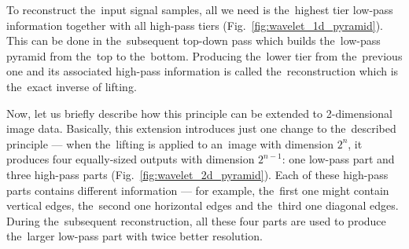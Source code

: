 To reconstruct the~input signal samples, all we need is the~highest tier low-pass information together with all high-pass tiers (Fig.~\ref{fig:wavelet_1d_pyramid}). This can be done in the~subsequent top-down pass which builds the~low-pass pyramid from the~top to the~bottom. Producing the~lower tier from the~previous one and its associated high-pass information is called the~reconstruction which is the~exact inverse of lifting.

Now, let us briefly describe how this principle can be extended to 2-dimensional image data. Basically, this extension introduces just one change to the~described principle --- when the~lifting is applied to an~image with dimension $2^n$, it produces four equally-sized outputs with dimension $2^{n-1}$: one low-pass part and three high-pass parts (Fig.~\ref{fig:wavelet_2d_pyramid}). Each of these high-pass parts contains different information --- for example, the~first one might contain vertical edges, the~second one horizontal edges and the~third one diagonal edges. During the~subsequent reconstruction, all these four parts are used to produce the~larger low-pass part with twice better resolution.

